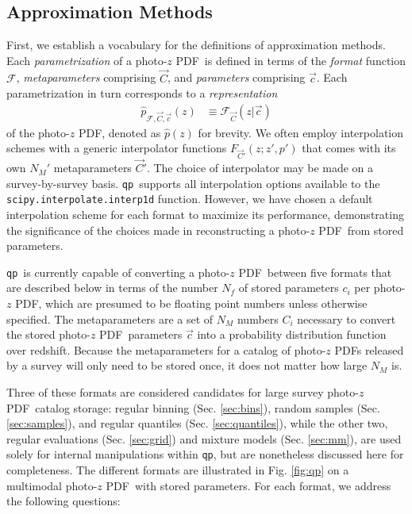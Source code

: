 \documentclass[\docopts]{\docclass}
\newcommand{\qp}{\texttt{qp}}
\newcommand{\pz}{photo-$z$ PDF}
\begin{document}
\subsection{Approximation Methods}
\label{sec:approx}



First, we establish a vocabulary for the definitions of approximation methods.  
Each \textit{parametrization} of a \pz\ is defined in terms of the 
\textit{format} function $\mathcal{F}$, \textit{metaparameters} comprising 
$\vec{C}$, and \textit{parameters} comprising $\vec{c}$.  Each parametrization 
in turn corresponds to a \textit{representation}
\begin{align}
  \label{eq:definition}
  \hat{p}_{\mathcal{F}, \vec{C}, \vec{c}}(z) &\equiv \mathcal{F}_{\vec{C}}(z | 
\vec{c})
\end{align}
of the \pz, denoted as $\hat{p}(z)$ for brevity.  We often employ interpolation 
schemes with a generic interpolator functions $F_{\vec{C}'}(z; z', p')$ that 
comes with its own $N_{M}'$ metaparameters $\vec{C}'$.  The choice of 
interpolator may be made on a survey-by-survey basis.  \qp\ supports all 
interpolation options available to the \texttt{scipy.interpolate.interp1d} 
function.  However, we have chosen a default interpolation scheme for each 
format to maximize its performance, demonstrating the significance of the 
choices made in reconstructing a \pz\ from stored parameters.

\qp\ is currently capable of converting a \pz\ between five formats that are 
described below in terms of the number $N_{f}$ of stored parameters $c_{i}$ per 
\pz, which are presumed to be floating point numbers unless otherwise 
specified.  The metaparameters are a set of $N_{M}$ numbers $C_{i}$ necessary 
to convert the stored \pz\ parameters $\vec{c}$ into a probability distribution 
function over redshift.  Because the metaparameters for a catalog of \pz s 
released by a survey will only need to be stored once, it does not matter how 
large $N_{M}$ is.

Three of these formats are considered candidates for large survey \pz\ catalog 
storage: regular binning (Sec. \ref{sec:bins}), random samples (Sec. 
\ref{sec:samples}), and regular quantiles (Sec. \ref{sec:quantiles}), while the 
other two, regular evaluations (Sec. \ref{sec:grid}) and mixture models (Sec. 
\ref{sec:mm}), are used solely for internal manipulations within \qp, but are 
nonetheless discussed here for completeness.  The different formats are 
illustrated in Fig. \ref{fig:qp} on a multimodal \pz\ with stored parameters.  
For each format, we address the following questions:
\end{document}
